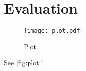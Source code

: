 \section{Evaluation}
\label{sec:Evaluation}
\begin{figure}
    \centering
    \texttt{[image: plot.pdf]}
    \caption{Plot.}
    \label{fig:plot}
\end{figure}
    
See \autoref{fig:plot}!